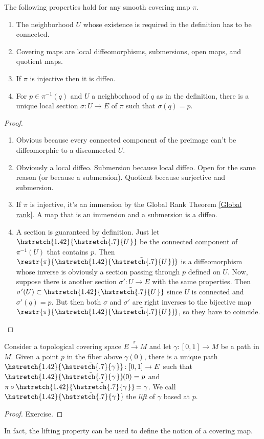 \documentclass[english,letterpaper]{article}%
\numberwithin{equation}{section}
\numberwithin{figure}{section}
\numberwithin{table}{section}
\theoremstyle{definition}
\theoremstyle{definition}
\theoremstyle{definition}
\theoremstyle{plain}
\theoremstyle{plain}
\theoremstyle{plain}
\theoremstyle{plain}
\theoremstyle{remark}
\theoremstyle{remark}
\newcommand\wt[1]{\hstretch{1.42}{\tilde{\hstretch{.7}{#1\mkern2mu}}}\mkern-2mu}
\begin{document}
\begin{prop}The following properties hold for any smooth covering map $\pi$.
\begin{enumerate}
    \item The neighborhood $U$ whose existence is required in the definition has to be connected.
    \item Covering maps are local diffeomorphisms, submersions, open maps, and quotient maps.
    \item If $\pi $ is injective then it is diffeo.
    \item For $p\in \pi^{-1}(q)$ and $U$ a neighborhood of $q$ as in the definition, there is a unique local section $\sigma:U\to E$ of $\pi$ such that $\sigma(q)=p$.
\end{enumerate}
\end{prop}
\begin{proof}
\begin{enumerate}
    \item Obvious because every connected component of the preimage can't be diffeomorphic to a disconnected $U$.
    \item Obviously a local diffeo. Submersion because local diffeo. Open for the same reason (or because a submersion). Quotient because surjective and submersion.
    \item If $\pi$ is injective, it's an immersion by the Global Rank Theorem \ref{Global rank}. A map that is an immersion and a submersion is a diffeo.
    \item A section is guaranteed by definition. Just let $\wt{U}$ be the connected component of $\pi^{-1}(U)$ that contains $p$. Then $\restr{\pi}{\wt{U}}$ is a diffeomorphism whose inverse is obviously a section passing through $p$ defined on $U$. Now, suppose there is another section $\sigma':U\to E$ with the same properties. Then $\sigma'(U)\subset \wt{U}$ since $U$ is connected and $\sigma'(q)=p$. But then both $\sigma$ and $\sigma'$ are right inverses to the bijective map $\restr{\pi}{\wt{U}}$, so they have to coincide.
\end{enumerate}
\end{proof}


\begin{thm}
Consider a topological covering space $E\overset{\pi}{\to}M$ and let $\gamma:[0,1]\to M$ be a path in $M$. Given a point $p$ in the fiber above $\gamma(0)$, there is a unique path $\wt{\gamma}:[0,1]\to E$ such that $\wt{\gamma}(0)=p$ and $\pi\circ\wt{\gamma}=\gamma$. We call $\wt{\gamma}$ the \emph{lift} of $\gamma$ based at $p$.
\end{thm}
\begin{proof}
Exercise.
\end{proof}
In fact, the lifting property can be used to define the notion of a covering map.
\end{document}
